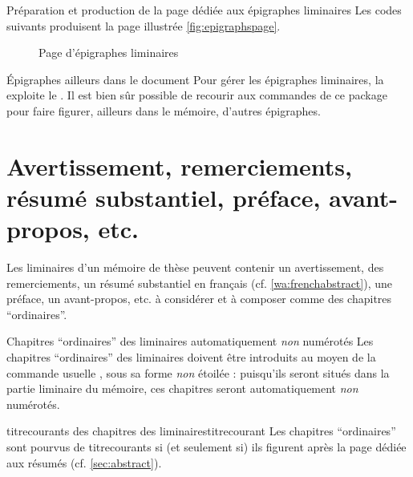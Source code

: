\begin{dbexample}{Préparation et production de la page dédiée aux épigraphes
    liminaires}{}
  \NoAutoSpacing%
  Les codes suivants produisent la page illustrée \vref{fig:epigraphspage}.
\end{dbexample}

\begin{figure}[htbp]
  \centering {}
  \caption{Page d'épigraphes liminaires}
  \label{fig:epigraphspage}
\end{figure}

\begin{dbremark}{Épigraphes ailleurs dans le document}{}
  Pour gérer les épigraphes liminaires, la \yatcl{} exploite le
   . Il est bien sûr
  possible de recourir aux commandes de ce package pour faire figurer, ailleurs
  dans le mémoire, d'autres épigraphes.
\end{dbremark}

\section{Avertissement, remerciements, résumé substantiel, préface,
  avant-propos, etc.}

Les \glspl{liminaire} d'un mémoire de thèse peuvent contenir un avertissement,
des remerciements, un résumé substantiel en français
(cf. \vref{wa:frenchabstract}), une préface, un avant-propos, etc.
à considérer et à composer comme des chapitres \enquote{ordinaires}.

\begin{dbwarning}{Chapitres \enquote{ordinaires} des \glspl{liminaire}
    automatiquement \emph{non} numérotés}{}
  Les chapitres \enquote{ordinaires} des \glspl{liminaire} doivent être
  introduits au moyen de la commande usuelle , sous sa
  forme \emph{non} étoilée : puisqu'ils seront situés dans la partie liminaire
  du mémoire, ces chapitres seront automatiquement \emph{non} numérotés.
\end{dbwarning}

\begin{dbremark}{\protect\Glspl{titrecourant} des chapitres des \protect\glspl{liminaire}}{titrecourant}
  Les chapitres \enquote{ordinaires} sont pourvus de \glspl{titrecourant} si
  (et seulement si) ils figurent après la page dédiée aux résumés
  (cf. \vref{sec:abstract}).
\end{dbremark}


